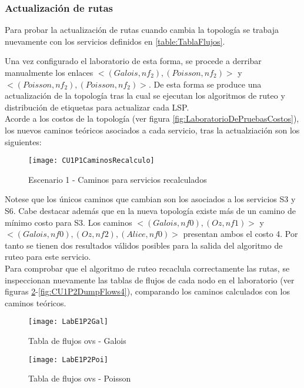 \newpage
\subsubsection{Actualizaci\'on de rutas}
Para probar la actualizaci\'on de rutas cuando cambia la topolog\'ia se trabaja nuevamente con los servicios definidos en \ref{table:TablaFlujos}. 

Una vez configurado el laboratorio de esta forma, se procede a derribar manualmente los enlaces $<(Galois, nf_2), (Poisson, nf_2)>$ y $<(Poisson, nf_2), (Poisson, nf_2)>$. De esta forma se produce una actualizaci\'on de la topolog\'ia tras la cual se ejecutan los algoritmos de ruteo y distribución de etiquetas para actualizar cada LSP.\\

Acorde a los costos de la topolog\'ia (ver figura \ref{fig:LaboratorioDePruebasCostos}), los nuevos caminos te\'oricos asociados a cada servicio, tras la actualziaci\'on son los siguientes:

\newpage
\begin{figure}[ht!] 
\centering    
\texttt{[image: CU1P1CaminosRecalculo]}
\caption[Escenario 1 - Caminos para servicios recalculados]{Escenario 1 - Caminos para servicios recalculados}
\label{fig:CUP1Caminos2}
\end{figure}
 
Notese que los \'unicos caminos que cambian son los asociados a los servicios S3 y S6. Cabe destacar adem\'as que en la nueva topolog\'ia existe m\'as de un camino de m\'inimo costo para S3. Los caminos $<(Galois, nf0), (Oz, nf1)>$ y $<(Galois, nf0), (Oz, nf2), (Alice, nf0)>$ presentan ambos el costo 4.
Por tanto se tienen dos resultados v\'alidos posibles para la salida del algoritmo de ruteo para este servicio.\\

Para comprobar que el algoritmo de ruteo recaclula correctamente las rutas, se inspeccionan nuevamente las tablas de flujos de cada nodo en el laboratorio (ver figuras \ref{fig:CU1P2DumpFlows1}-\ref{fig:CU1P2DumpFlows4}), comparando los caminos calculados con los caminos te\'oricos.

\newpage
\begin{figure}[ht!] 
\centering    
\texttt{[image: LabE1P2Gal]}
\caption[Tabla de flujos ovs - Galois]{Tabla de flujos ovs - Galois}
\label{fig:CU1P2DumpFlows1}
\end{figure}

\begin{figure}[h] 
\centering    
\texttt{[image: LabE1P2Poi]}
\caption[Tabla de flujos ovs - Poisson]{Tabla de flujos ovs - Poisson}
\label{fig:CU1P2DumpFlows3}
\end{figure}

